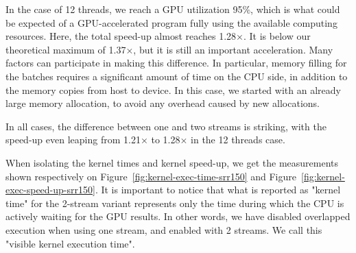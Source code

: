 In the case of 12 threads, we reach a GPU utilization 95\%, which is what could be expected of a GPU-accelerated program fully using the available computing resources. Here, the total speed-up almost reaches 1.28$\times$. It is below our theoretical maximum of 1.37$\times$, but it is still an important acceleration. Many factors can participate in making this difference. In particular, memory filling for the batches requires a significant amount of time on the CPU side, in addition to the memory copies from host to device. In this case, we started with an already large memory allocation, to avoid any overhead caused by new allocations.

In all cases, the difference between one and two streams is striking, with the speed-up even leaping from 1.21$\times$ to 1.28$\times$ in the 12 threads case.

When isolating the kernel times and kernel speed-up, we get the measurements shown respectively on Figure~\ref{fig:kernel-exec-time-srr150} and Figure~\ref{fig:kernel-exec-speed-up-srr150}. It is important to notice that what is reported as "kernel time" for the 2-stream variant represents only the time during which the CPU is actively waiting for the GPU results. In other words, we have disabled overlapped execution when using one stream, and enabled with 2 streams. We call this "visible kernel execution time".


